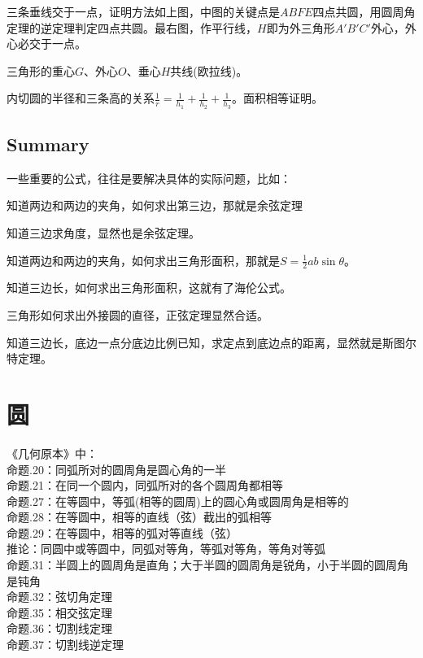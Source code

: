 \documentclass[../main.tex]{subfiles}
\begin{document}
三条垂线交于一点，证明方法如上图，中图的关键点是$ABFE$四点共圆，用圆周角定理的逆定理判定四点共圆。最右图，作平行线，$H$即为外三角形$A'B'C'$外心，外心必交于一点。

三角形的重心$G$、外心$O$、垂心$H$共线(欧拉线)。

内切圆的半径和三条高的关系$\displaystyle \frac{1}{r}=\frac{1}{h_1}+\frac{1}{h_2}+\frac{1}{h_3}$。面积相等证明。

\subsection{Summary}
一些重要的公式，往往是要解决具体的实际问题，比如：

知道两边和两边的夹角，如何求出第三边，那就是余弦定理

知道三边求角度，显然也是余弦定理。

知道两边和两边的夹角，如何求出三角形面积，那就是$S=\frac{1}{2}ab\sin \theta$。

知道三边长，如何求出三角形面积，这就有了海伦公式。

三角形如何求出外接圆的直径，正弦定理显然合适。

知道三边长，底边一点分底边比例已知，求定点到底边点的距离，显然就是斯图尔特定理。

\clearpage
\section{圆}
《几何原本》中：\\
命题\uppercase\expandafter{}.20：同弧所对的圆周角是圆心角的一半\\
命题\uppercase\expandafter{}.21：在同一个圆内，同弧所对的各个圆周角都相等\\
命题\uppercase\expandafter{}.27：在等圆中，等弧(相等的圆周)上的圆心角或圆周角是相等的\\
命题\uppercase\expandafter{}.28：在等圆中，相等的直线（弦）截出的弧相等\\
命题\uppercase\expandafter{}.29：在等圆中，相等的弧对等直线（弦）\\
\phantom{xxxxx}推论：同圆中或等圆中，同弧对等角，等弧对等角，等角对等弧\\
命题\uppercase\expandafter{}.31：半圆上的圆周角是直角；大于半圆的圆周角是锐角，小于半圆的圆周角是钝角\\
命题\uppercase\expandafter{}.32：弦切角定理\\
命题\uppercase\expandafter{}.35：相交弦定理\\
命题\uppercase\expandafter{}.36：切割线定理\\
命题\uppercase\expandafter{}.37：切割线逆定理
\end{document}

